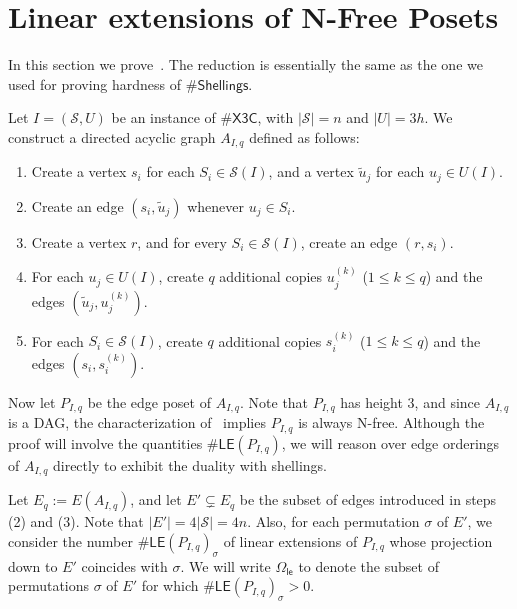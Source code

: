 \documentclass[11pt]{amsart}
\newcommand{\ns}{s}
\newcommand{\nou}{\tilde{u}}
\newcommand{\omle}{\Omega_{\mathsf{le}}}
\begin{document}
\section{Linear extensions of N-Free Posets}

In this section we prove~. The reduction is essentially the same as the one we used for proving hardness of $\#\mathsf{Shellings}$.

Let $I = (\mathcal{S}, U)$ be an instance of $\#\mathsf{X3C}$, with $|\mathcal{S}| = n$ and $|U| = 3h$.
We construct a directed acyclic graph $A_{I, q}$ defined as follows:
\begin{enumerate}
    \item Create a vertex $\ns_i$ for each $S_i \in \mathcal{S}(I)$, and a vertex $\nou_j$ for each $u_j \in U(I)$.
    \item Create an edge $(\ns_i, \nou_j)$ whenever $u_j \in S_i$.
    \item Create a vertex $r$, and for every $S_i \in \mathcal{S}(I)$, create an edge $(r, \ns_i)$.
    \item For each $u_j \in U(I)$, create $q$ additional copies $u_j^{(k)}$ ($1 \leq k \leq q$) and the edges $(\nou_j, u_j^{(k)})$.
    \item For each $S_i \in \mathcal{S}(I)$, create $q$ additional copies $s_i^{(k)}$ ($1 \leq k \leq q$) and the edges $(\ns_i, \ns_i^{(k)})$.
\end{enumerate}
Now let $P_{I, q}$ be the edge poset of $A_{I, q}$. Note that $P_{I, q}$ has height $3$, and since $A_{I, q}$ is a DAG, the characterization of~\cite{FelsnerManneville} implies $P_{I, q}$ is always N-free. 
Although the proof will involve the quantities $\#\mathsf{LE}(P_{I, q})$, we will reason over edge orderings of $A_{I, q}$ directly to exhibit the duality with shellings.

%     

Let $E_q := E(A_{I, q})$,
and let $E' \subsetneq E_q$ be the subset of edges introduced in steps (2) and (3). Note that $|E'| = 4|\mathcal{S}| = 4n$.
Also, for each permutation $\sigma$ of $E'$, we consider the number $\#\mathsf{LE}(P_{I, q})_{\sigma}$ of linear extensions of $P_{I, q}$ whose projection down to $E'$ coincides with $\sigma$. We will write $\omle$ to denote the subset of permutations $\sigma$ of $E'$ for which $\#\mathsf{LE}(P_{I, q})_{\sigma} > 0$.
\end{document}
